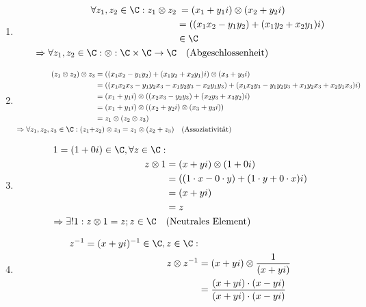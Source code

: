 \documentclass[main.tex]{subfiles}
\begin{document}
\begin{Beweis}
		\begin{enumerate}
			\item \begin{align*}
						\forall z_1, z_2 \in \C: z_1 \otimes z_2 &\:= (x_1 + y_1i) \otimes (x_2 + y_2i) \\
														   		 &= ((x_1x_2 - y_1y_2) + (x_1y_2 + x_2y_1)i) \\
														   		 &\in \C \\
						\Rightarrow \forall z_1, z_2 \in \C: \otimes : \C \times \C \rightarrow \C & \quad \text{(Abgeschlossenheit)}
				  \end{align*}
			\item \begin{align*}
				  		(z_1 \otimes z_2) \otimes z_3 &= ((x_1x_2 - y_1y_2) + (x_1y_2 + x_2y_1)i) \otimes (x_3 + y_3i) \\
										  			  &= ((x_1x_2x_3 - y_1y_2x_3 - x_1y_2y_3 - x_2y_1y_3) + (x_1x_2y_3 - y_1y_2y_3 + x_1y_2x_3 + x_2y_1x_3)i) \\
												      &= (x_1 + y_1i) \otimes ((x_2x_3 - y_2y_3) + (x_2y_3 + x_3y_2)i) \\
												      &= (x_1 + y_1i) \otimes ((x_2 + y_2i) \otimes (x_3 + y_3i)) \\
												      &= z_1 \otimes (z_2 \otimes z_3) \\
						\Rightarrow \forall z_1, z_2, z_3 \in \C: (z_1 + &z_2) \otimes  z_3 = z_1 \otimes (z_2 + z_3) \quad \text{(Assoziativität)}
				  \end{align*}
			\item \begin{align*}
						1 = (1 + 0i) \in \C, \forall z \in \C:& \\
												   z \otimes 1 &= (x + yi) \otimes (1 + 0i) \\
													  		   &= ((1 \cdot x - 0 \cdot y) + (1 \cdot y + 0 \cdot x)i) \\
															   &= (x + yi) \\
															   &= z \\
						\Rightarrow \exists! 1: z \otimes 1 = z; z \in \C \quad &\text{(Neutrales Element)}
				  \end{align*}
			\item \begin{align*}
	  					z^{-1} = (x + yi)^{-1} \in \C, z \in \C:& \\
								  z \otimes z^{-1} &= (x + yi) \otimes \dfrac{1}{(x + yi)} \\
								  			  	   &= \dfrac{(x + yi) \cdot (x - yi)}{(x + yi) \cdot (x - yi)} \\

\end{align*}
\end{enumerate}
\end{Beweis}
\end{document}
